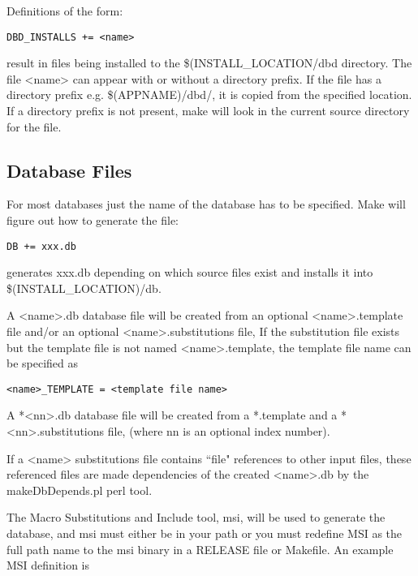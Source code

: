 Definitions of the form:

\begin{verbatim}DBD_INSTALLS += <name>
\end{verbatim}result in files being installed to the \$(INSTALL\_LOCATION/dbd directory. The file \textless{}name\textgreater{} can appear with or without 
a directory prefix. If the file has a directory prefix e.g. \$(APPNAME)/dbd/, it is copied from the specified location. If a 
directory prefix is not present, make will look in the current source directory for the file.

\subsection{Database Files}

For most databases just the name of the database has to be specified. Make will figure out how to generate the file: 

\begin{verbatim}DB += xxx.db
\end{verbatim}generates xxx.db depending on which source files exist and installs it into \$(INSTALL\_LOCATION)/db.

A \textless{}name\textgreater{}.db database file will be created from an optional \textless{}name\textgreater{}.template file and/or an optional 
\textless{}name\textgreater{}.substitutions file, If the substitution file exists but the template file is not named \textless{}name\textgreater{}.template, the template 
file name can be specified as

\begin{verbatim}<name>_TEMPLATE = <template file name>
\end{verbatim}A *\textless{}nn\textgreater{}.db database file will be created from a *.template and a *\textless{}nn\textgreater{}.substitutions file, (where nn is an optional index 
number).

If a \textless{}name\textgreater{} substitutions file contains ``file" references to other input files, these referenced files are  made dependencies 
of the created \textless{}name\textgreater{}.db by the makeDbDepends.pl perl tool.

The Macro Substitutions and Include tool, msi, will be used to generate the database, and msi must either be in your path 
or you must redefine MSI as the full path name to the msi binary in a RELEASE file or Makefile. An example MSI 
definition is

